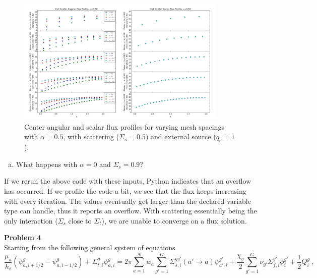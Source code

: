\documentclass[10pt]{article}
\begin{document}
\begin{figure}[H]
    \centering
    \includegraphics[width=0.9\textwidth]{Figures/FluxProfile_a=05_source}
    \caption{Center angular and scalar flux profiles for varying mesh spacings with $\alpha = 0.5$, with scattering ($\Sigma_s = 0.5$) and external source ($q_e=1$).}
    \label{fig10}
\end{figure}

%
%
%

\newpage
\begin{enumerate}[(d)]
\item What happens with $\alpha = 0$ and $\Sigma_s = 0.9$?
\end{enumerate}

If we rerun the above code with these inputs, Python indicates that an overflow has occurred. If we profile the code a bit, we see that the flux keeps increasing with every iteration. The values eventually get larger than the declared variable type can handle, thus it reports an overflow. With scattering essentially being the only interaction ($\Sigma_s$ close to $\Sigma_t$), we are unable to converge on a flux solution.





\newpage
\noindent \textbf{Problem 4}\\
Starting from the following general system of equations
%
\begin{equation*}
\frac{\mu_a}{h_i}(\psi_{a,i+1/2}^g - \psi_{a,i-1/2}^g)+ \Sigma_{t,i}^g\psi_{a,i}^g = 2\pi\sum_{a=1}^N w_a \sum_{g'=1}^G \Sigma_{s, i}^{gg'}(a'\rightarrow a)\psi_{a',i}^{g'} + \frac{\chi_g}{2}\sum_{g'=1}^G \nu_{g'}\Sigma_{f,i}^{g'} \phi_{i}^{g'} + \frac{1}{2}Q_i^g\:,
\end{equation*}
\end{document}
